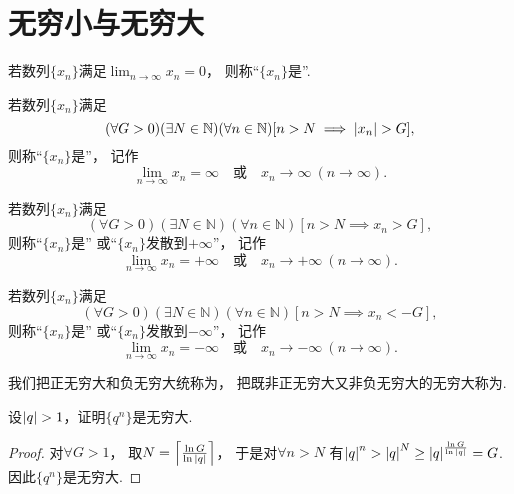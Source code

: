 \section{无穷小与无穷大}
\begin{definition}
若数列\(\{x_n\}\)满足\(\lim_{n\to\infty} x_n = 0\)，
则称“\(\{x_n\}\)是”.
\end{definition}

\begin{definition}
若数列\(\{x_n\}\)满足\[
	(\forall G>0)
	(\exists N\in\mathbb{N})
	(\forall n\in\mathbb{N})
	[n > N \implies \abs{x_n} > G],
\]
则称“\(\{x_n\}\)是”，
记作\[
	\lim_{n\to\infty} x_n = \infty
	\quad\text{或}\quad
	x_n\to\infty\ (n\to\infty).
\]

若数列\(\{x_n\}\)满足\[
	(\forall G>0)
	(\exists N\in\mathbb{N})
	(\forall n\in\mathbb{N})
	[n > N \implies x_n > G],
\]
则称“\(\{x_n\}\)是”
或“\(\{x_n\}\)发散到\(+\infty\)”，
记作\[
	\lim_{n\to\infty} x_n = +\infty
	\quad\text{或}\quad
	x_n\to+\infty\ (n\to\infty).
\]

若数列\(\{x_n\}\)满足\[
	(\forall G>0)
	(\exists N\in\mathbb{N})
	(\forall n\in\mathbb{N})
	[n > N \implies x_n < -G],
\]
则称“\(\{x_n\}\)是”
或“\(\{x_n\}\)发散到\(-\infty\)”，
记作\[
	\lim_{n\to\infty} x_n = -\infty
	\quad\text{或}\quad
	x_n\to-\infty\ (n\to\infty).
\]

我们把正无穷大和负无穷大统称为，
把既非正无穷大又非负无穷大的无穷大称为.
\end{definition}

\begin{example}
设\(\abs{q}>1\)，证明\(\{q^n\}\)是无穷大.
\begin{proof}
对\(\forall G>1\)，
取\(N=\ceil*{\frac{\ln G}{\ln\abs{q}}}\)，
于是对\(\forall n>N\)
有\(\abs{q}^n > \abs{q}^N \geq \abs{q}^{\frac{\ln G}{\ln\abs{q}}} = G\).
因此\(\{q^n\}\)是无穷大.
\end{proof}
\end{example}


